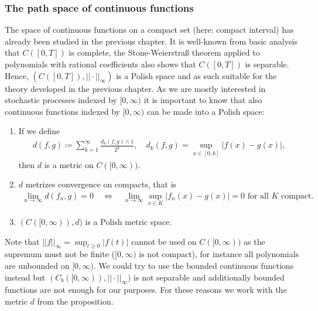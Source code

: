 \subsubsection{The path space of continuous functions}
The space of continuous functions on a compact set (here: compact interval) has already been studied in the previous chapter. It is well-known from basic analysis that $C([0,T])$ is complete, the Stone-Weierstra\ss{} theorem applied to polynomials with rational coefficients also shows that $C([0,T])$ is separable. Hence, $(C([0,T]), ||\cdot ||_\infty)$ is a Polish space and as such suitable for the theory developed in the previous chapter. As we are mostly interested in stochastic processes indexed by $[0,\infty)$ it is important to know that also continuous functions indexed by $[0,\infty)$ can be made into a Polish space:
\begin{laussagewerkzeug}
\begin{prop}\label{prop:C}
	\begin{enumerate}[label=(\roman*)]
		\item If we define
			\begin{align*}
				d(f,g)\coloneqq \sum_{k=1}^{\infty} \frac{d_k(f,g)\wedge 1}{2^k},\quad d_k(f,g) = \sup_{x\in [0,k]} \lvert f(x) - g(x)\rvert,
			\end{align*}
		then $d$ is a metric on $C([0,\infty))$. 
		\item $d$ metrizes convergence on compacts, that is
		\begin{align*}
			\lim_{n\to\infty} d(f_n,g)=0\quad \Leftrightarrow \quad \lim_{n\to\infty}\sup_{x\in K}|f_n(x)-g(x)|=0\text{ for all }K\text{ compact.}
		\end{align*}
		\item $( C([0,\infty)),d )$ is a Polish metric space.
	\end{enumerate}
\end{prop}
\end{laussagewerkzeug}
Note that $||f||_\infty=\sup_{t\geq 0}|f(t)|$ cannot be used on $C([0,\infty))$ as the supremum must not be finite ($[0,\infty)$ is not compact), for instance all polynomials are unbounded on $[0,\infty)$. We could try to use the bounded continuous functions instead but $(C_b([0,\infty)),||\cdot||_\infty)$ is not separable and additionally bounded functions are not enough for our purposes. For these reasons we work with the metric $d$ from the proposition.
